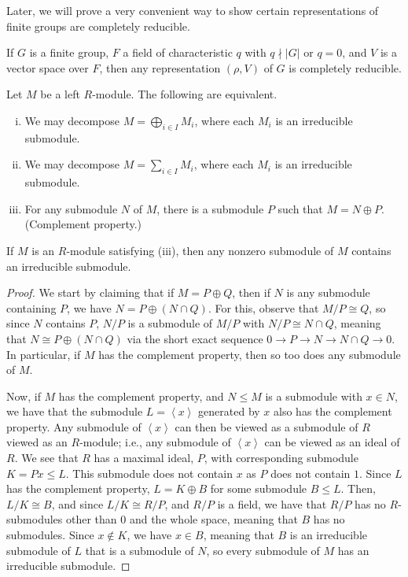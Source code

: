 \documentclass[10pt]{mypackage}
\begin{document}
Later, we will prove a very convenient way to show certain representations of finite groups are completely reducible.
\begin{theorem}
  If $G$ is a finite group, $F$ a field of characteristic $q$ with $q\nmid \left\vert G \right\vert$ or $q= 0$, and $V$ is a vector space over $F$, then any representation $\left( \rho,V \right)$ of $G$ is completely reducible.
\end{theorem}
\begin{theorem}
  Let $M$ be a left $R$-module. The following are equivalent.
  \begin{enumerate}[(i)]
    \item We may decompose $M = \bigoplus_{i\in I}M_i$, where each $M_i$ is an irreducible submodule.
    \item We may decompose $M = \sum_{i\in I}M_i$, where each $M_i$ is an irreducible submodule.
    \item For any submodule $N$ of $M$, there is a submodule $P$ such that $M = N\oplus P$. (Complement property.)
  \end{enumerate}
\end{theorem}
\begin{lemma}
  If $M$ is an $R$-module satisfying (iii), then any nonzero submodule of $M$ contains an irreducible submodule.
\end{lemma}
\begin{proof}
  We start by claiming that if $M = P\oplus Q$, then if $N$ is any submodule containing $P$, we have $N = P\oplus \left( N\cap Q \right)$. For this, observe that $M/P\cong Q$, so since $N$ contains $P$, $N/P$ is a submodule of $M/P$ with $N/P\cong N\cap Q$, meaning that $N\cong P\oplus \left( N\cap Q \right)$ via the short exact sequence $0 \rightarrow P\rightarrow N\rightarrow N\cap Q \rightarrow 0$. In particular, if $M$ has the complement property, then so too does any submodule of $M$.

  Now, if $M$ has the complement property, and $N\leq M$ is a submodule with $x\in N$, we have that the submodule $L = \left\langle x \right\rangle$ generated by $x$ also has the complement property. Any submodule of $\left\langle x \right\rangle$ can then be viewed as a submodule of $R$ viewed as an $R$-module; i.e., any submodule of $\left\langle x \right\rangle$ can be viewed as an ideal of $R$. We see that $R$ has a maximal ideal, $P$, with corresponding submodule $K = Px\leq L$. This submodule does not contain $x$ as $P$ does not contain $1$. Since $L$ has the complement property, $L = K\oplus B$ for some submodule $B\leq L$. Then, $L/K\cong B$, and since $L/K\cong R/P$, and $R/P$ is a field, we have that $R/P$ has no $R$-submodules other than $0$ and the whole space, meaning that $B$ has no submodules. Since $x\notin K$, we have $x\in B$, meaning that $B$ is an irreducible submodule of $L$ that is a submodule of $N$, so every submodule of $M$ has an irreducible submodule.
\end{proof}
\end{document}
